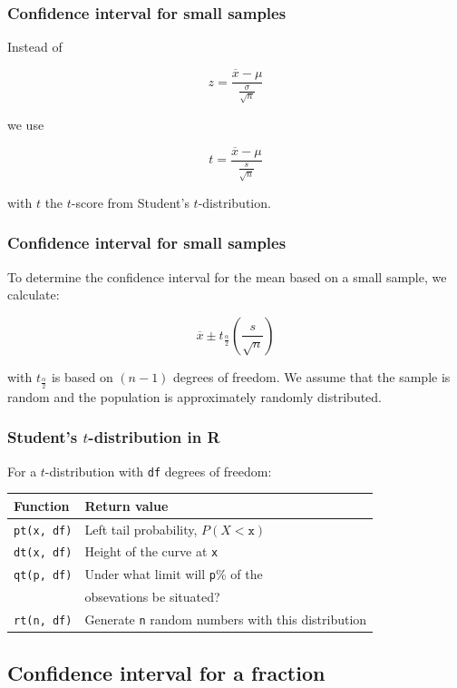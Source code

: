 \documentclass{beamer}
\begin{document}
\begin{frame}
  \frametitle{Confidence interval for small samples}
  Instead of

\[ z = \frac{\overline{x} - \mu}{\frac{\sigma}{\sqrt{n}}} \]

we use

\[ t = \frac{\overline{x} - \mu}{\frac{s}{\sqrt{n}}} \]

  with $t$ the $t$-score from Student's $t$-distribution.
\end{frame}

\begin{frame}
  \frametitle{Confidence interval for small samples}

  To determine the confidence interval for the mean based on a small sample, we calculate:

  \[ \overline{x} \pm t_{\frac{\alpha}{2}}(\frac{s}{\sqrt{n}}) \]

  with $t_{\frac{\alpha}{2}}$ is based on $(n-1)$ degrees of freedom. We assume that the sample is random and the population is approximately randomly distributed.
\end{frame}

\begin{frame}[fragile]
\frametitle{Student's $t$-distribution in R}

For a $t$-distribution with \texttt{df} degrees of freedom:
\vfill
\centering
\begin{tabular}{ll}
	\textbf{Function} & \textbf{Return value}                                    \\ \hline
	\verb|pt(x, df)| & Left tail probability, $P(X<\mathtt{x})$                  \\
	\verb|dt(x, df)| & Height of the curve at \texttt{x}                     \\
	\verb|qt(p, df)| & Under what limit will \texttt{p}\% of the     \\
	                 & obsevations be situated?                             \\
	\verb|rt(n, df)| & Generate \texttt{n} random numbers with this distribution
\end{tabular}

\end{frame}

\subsection{Confidence interval for a fraction}
\end{document}
